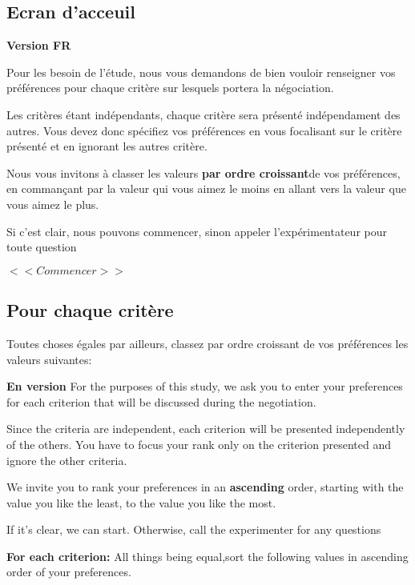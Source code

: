 \documentclass [french]{paper}
\begin{document}
			\subsection{Ecran d'acceuil}
			
				\textbf{Version FR}
				
				
				Pour les besoin de l'étude, nous vous demandons de bien vouloir renseigner vos préférences pour chaque critère sur lesquels portera la négociation.
				
				Les critères étant indépendants, chaque critère sera présenté indépendament des autres. Vous devez donc spécifiez vos préférences en vous focalisant sur le critère présenté et en ignorant les autres critère.
				
				Nous vous invitons à classer les valeurs \textbf{par ordre croissant}de vos préférences, en commançant par la valeur qui vous aimez le moins en allant vers la valeur que vous aimez le plus.
				
				Si c'est clair, nous pouvons commencer, sinon appeler l'expérimentateur pour toute question
				
				$<<Commencer>>$
				
	
		\subsection{Pour chaque critère}
			Toutes choses égales par ailleurs, classez par ordre croissant de vos préférences les valeurs suivantes: 
		

			
			\textbf{En version}
			For the purposes of this study, we ask you to enter your preferences for each criterion that will be discussed during the negotiation.
			
			Since the criteria are independent, each criterion will be presented independently of the others. You have to focus your rank only on the criterion presented and ignore the other criteria.
			
			We invite you to rank your preferences in an \textbf {ascending} order, starting with the value you like the least,  to the value you like the most.
			
			If it's clear, we can start. Otherwise, call the experimenter for any questions
		
			
				\textbf{For each criterion:}  All things being equal,sort the following values in ascending order of your preferences.
		
	
\end{document}
